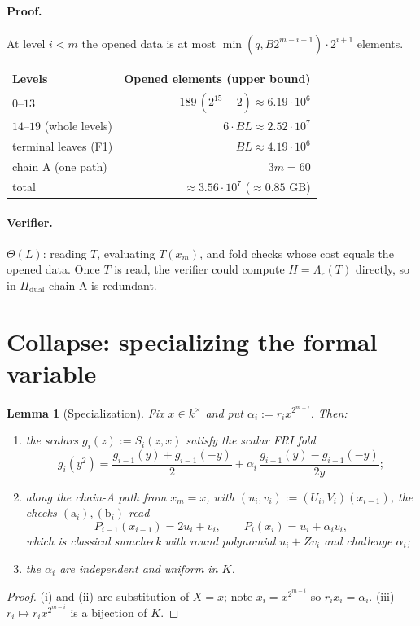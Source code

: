 \documentclass[11pt]{article}
\newtheorem{lemma}[theorem]{Lemma}
\theoremstyle{definition}
\newcommand{\K}{K}
\begin{document}
\paragraph{Proof.} At level $i<m$ the opened data is at most $\min(q,B2^{m-i-1})\cdot2^{i+1}$ elements.
\begin{center}
\begin{tabular}{@{}lr@{}}
\toprule
Levels & Opened elements (upper bound) \\
\midrule
$0$--$13$ & $189\,(2^{15}-2)\approx6.19\cdot10^6$ \\
$14$--$19$ (whole levels) & $6\cdot BL\approx2.52\cdot10^7$ \\
terminal leaves (F1) & $BL\approx4.19\cdot10^6$ \\
chain A (one path) & $3m=60$ \\
\midrule
total & $\approx3.56\cdot10^7$ ($\approx0.85$ GB) \\
\bottomrule
\end{tabular}
\end{center}

\paragraph{Verifier.} $\Theta(L)$: reading $T$, evaluating $T(x_m)$, and fold checks whose cost equals the opened data. Once $T$ is read, the verifier could compute $H=\Lambda_r(T)$ directly, so in $\Pi_{\mathrm{dual}}$ chain A is redundant.

\section{Collapse: specializing the formal variable}

\begin{lemma}[Specialization]\label{lem:spec}
Fix $x\in k^\times$ and put $\alpha_i:=r_ix^{2^{m-i}}$. Then:
\begin{enumerate}[label=(\roman*)]
\item the scalars $g_i(z):=S_i(z,x)$ satisfy the scalar FRI fold
\[
g_i(y^2)=\frac{g_{i-1}(y)+g_{i-1}(-y)}2+\alpha_i\,\frac{g_{i-1}(y)-g_{i-1}(-y)}{2y};
\]
\item along the chain-A path from $x_m=x$, with $(u_i,v_i):=(U_i,V_i)(x_{i-1})$, the checks $(\mathrm a_i),(\mathrm b_i)$ read
\[
P_{i-1}(x_{i-1})=2u_i+v_i,\qquad P_i(x_i)=u_i+\alpha_iv_i,
\]
which is classical sumcheck with round polynomial $u_i+Zv_i$ and challenge $\alpha_i$;
\item the $\alpha_i$ are independent and uniform in $\K$.
\end{enumerate}
\end{lemma}
\begin{proof}
(i) and (ii) are substitution of $X=x$; note $x_i=x^{2^{m-i}}$ so $r_ix_i=\alpha_i$. (iii) $r_i\mapsto r_ix^{2^{m-i}}$ is a bijection of $\K$.
\end{proof}
\end{document}
